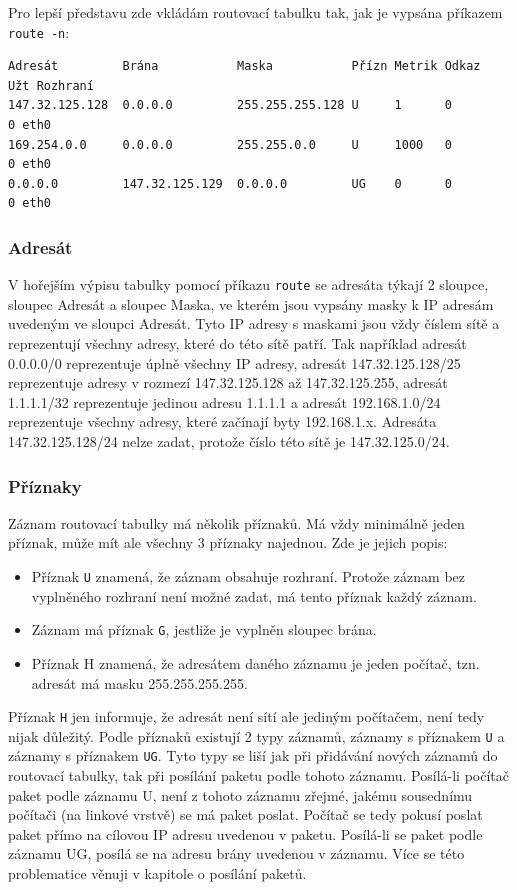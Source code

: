 Pro lepší představu zde vkládám routovací tabulku tak, jak je vypsána příkazem \verb|route -n|:
\begin{verbatim}
Adresát         Brána           Maska           Přízn Metrik Odkaz  Užt Rozhraní
147.32.125.128  0.0.0.0         255.255.255.128 U     1      0        0 eth0
169.254.0.0     0.0.0.0         255.255.0.0     U     1000   0        0 eth0
0.0.0.0         147.32.125.129  0.0.0.0         UG    0      0        0 eth0
\end{verbatim}

\subsubsection{Adresát}

V hořejším výpisu tabulky pomocí příkazu \verb|route| se adresáta týkají 2 sloupce, sloupec Adresát a sloupec Maska, ve kterém jsou vypsány masky k IP adresám uvedeným ve sloupci Adresát. Tyto IP adresy s maskami jsou vždy číslem sítě a reprezentují všechny adresy, které do této sítě patří. Tak například adresát 0.0.0.0/0 reprezentuje úplně všechny IP adresy, adresát 147.32.125.128/25 reprezentuje adresy v rozmezí 147.32.125.128 až 147.32.125.255, adresát 1.1.1.1/32 reprezentuje jedinou adresu 1.1.1.1 a adresát 192.168.1.0/24 reprezentuje všechny adresy, které začínají byty 192.168.1.x. Adresáta 147.32.125.128/24 nelze zadat, protože číslo této sítě je 147.32.125.0/24.

\subsubsection{Příznaky}\label{routTabulka-priznaky}

Záznam routovací tabulky má několik příznaků. Má vždy minimálně jeden příznak, může mít ale všechny 3 příznaky najednou. Zde je jejich popis:
\begin{itemize}
\item Příznak \verb|U| znamená, že záznam obsahuje rozhraní. Protože záznam bez vyplněného rozhraní není možné zadat, má tento příznak každý záznam.
\item Záznam má příznak \verb|G|, jestliže je vyplněn sloupec brána.
\item Příznak H znamená, že adresátem daného záznamu je jeden počítač, tzn. adresát má masku 255.255.255.255.
\end{itemize}
Příznak \verb|H| jen informuje, že adresát není sítí ale jediným počítačem, není tedy nijak důležitý. Podle příznaků existují 2 typy záznamů, záznamy s příznakem \verb|U| a záznamy s příznakem \verb|UG|. Tyto typy se liší jak při přidávání nových záznamů do routovací tabulky, tak při posílání paketu podle tohoto záznamu. Posílá-li počítač paket podle záznamu U, není z tohoto záznamu zřejmé, jakému sousednímu počítači (na linkové vrstvě) se má paket poslat. Počítač se tedy pokusí poslat paket přímo na cílovou IP adresu uvedenou v paketu. Posílá-li se paket podle záznamu UG, posílá se na adresu brány uvedenou v záznamu. Více se této problematice věnuji v kapitole o posílání paketů.

